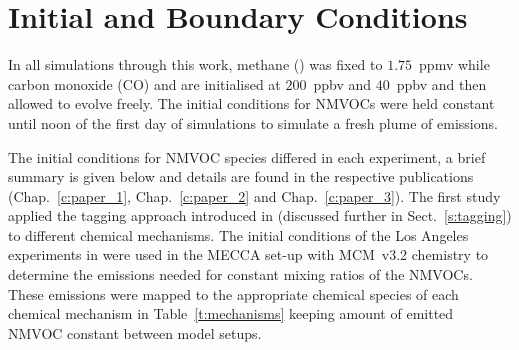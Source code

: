 \section{Initial and Boundary Conditions} \label{s:initial_conditions}
In all simulations through this work, methane () was fixed to $1.75$~ppmv while carbon monoxide (CO) and  are initialised at $200$~ppbv and $40$~ppbv and then allowed to evolve freely.
The initial conditions for NMVOCs were held constant until noon of the first day of simulations to simulate a fresh plume of emissions.

The initial conditions for NMVOC species differed in each experiment, a brief summary is given below and details are found in the respective publications (Chap.~\ref{c:paper_1}, Chap.~\ref{c:paper_2} and Chap.~\ref{c:paper_3}).
The first study applied the tagging approach introduced in \citet{Butler:2011} (discussed further in Sect.~\ref{s:tagging}) to different chemical mechanisms.
The initial conditions of the Los Angeles experiments in \citet{Butler:2011} were used in the MECCA set-up with MCM~v3.2 chemistry to determine the emissions needed for constant mixing ratios of the NMVOCs.
These emissions were mapped to the appropriate chemical species of each chemical mechanism in Table~\ref{t:mechanisms} keeping amount of emitted NMVOC constant between model setups.

